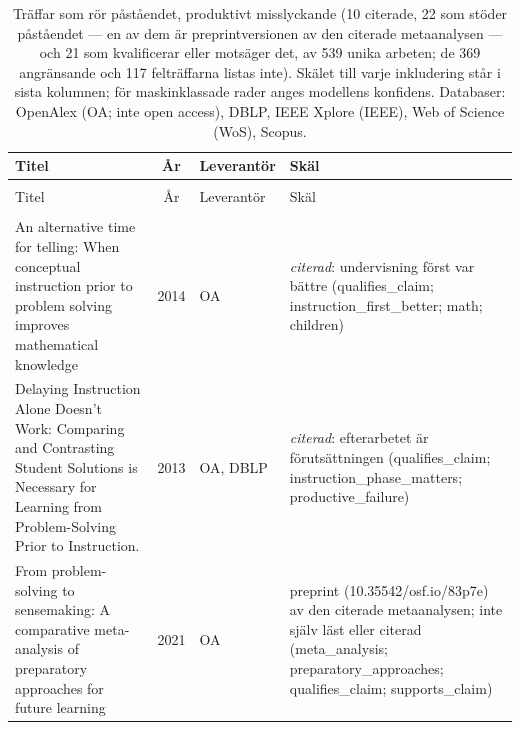 
\begingroup\footnotesize
\begin{longtable}{@{}%
  >{\raggedright\arraybackslash}p{}c%
  >{\raggedright\arraybackslash}p{}%
  >{\raggedright\arraybackslash\footnotesize}p{}@{}}
\caption{Träffar som rör påståendet, produktivt misslyckande (10 citerade, 22 som stöder påståendet --- en av dem är preprintversionen av den citerade metaanalysen --- och 21 som kvalificerar eller motsäger det, av 539 unika arbeten; de 369 angränsande och 117 felträffarna listas inte). Skälet till varje inkludering står i sista kolumnen; för maskinklassade rader anges modellens konfidens. Databaser: OpenAlex (OA; inte open access), DBLP, IEEE Xplore (IEEE), Web of Science (WoS), Scopus.}\label{tab:sok-pf}\\
\toprule
Titel & År & Leverantör & Skäl \\
\midrule
\endfirsthead
\multicolumn{4}{@{}l}{\emph{\tablename~\thetable{} (\GetTranslation{continued})}}\\
\toprule
Titel & År & Leverantör & Skäl \\
\midrule
\endhead
\midrule \multicolumn{4}{r@{}}{\emph{\GetTranslation{continued on the next page}}}\\
\endfoot
\bottomrule
\endlastfoot
An alternative time for telling: When conceptual instruction prior to problem solving improves mathematical knowledge & 2014 & OA & \emph{citerad}: undervisning först var bättre (qualifies\_\allowbreak{}claim; instruction\_\allowbreak{}first\_\allowbreak{}better; math; children) \\
Delaying Instruction Alone Doesn't Work: Comparing and Contrasting Student Solutions is Necessary for Learning from Problem-Solving Prior to Instruction. & 2013 & OA, DBLP & \emph{citerad}: efterarbetet är förutsättningen (qualifies\_\allowbreak{}claim; instruction\_\allowbreak{}phase\_\allowbreak{}matters; productive\_\allowbreak{}failure) \\
From problem-solving to sensemaking: A comparative meta-analysis of preparatory approaches for future learning & 2021 & OA & preprint (10.35542/osf.io/83p7e) av den citerade metaanalysen; inte själv läst eller citerad (meta\_\allowbreak{}analysis; preparatory\_\allowbreak{}approaches; qualifies\_\allowbreak{}claim; supports\_\allowbreak{}claim) \\

\end{longtable}
